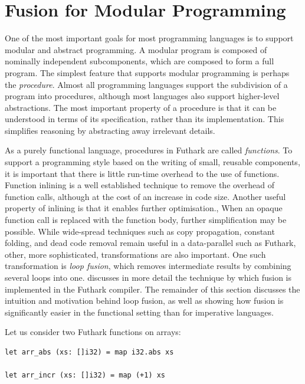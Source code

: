 \section{Fusion for Modular Programming}
\label{sec:fusion-for-modular-programming}

One of the most important goals for most programming languages is to
support modular and abstract programming.  A modular program is
composed of nominally independent subcomponents, which are composed to
form a full program.  The simplest feature that supports modular
programming is perhaps the \textit{procedure}.  Almost all programming
languages support the subdivision of a program into procedures,
although most languages also support higher-level abstractions.  The
most important property of a procedure is that it can be understood in
terms of its specification, rather than its implementation.  This
simplifies reasoning by abstracting away irrelevant details.

As a purely functional language, procedures in Futhark are called
\textit{functions}.  To support a programming style based on the
writing of small, reusable components, it is important that there is
little run-time overhead to the use of functions.  Function inlining
is a well established technique to remove the overhead of function
calls, although at the cost of an increase in code size.  Another
useful property of inlining is that it enables further optimisation.,
When an opaque function call is replaced with the function body,
further simplification may be possible.  While wide-spread techniques
such as copy propagation, constant folding, and dead code removal
remain useful in a data-parallel such as Futhark, other, more
sophisticated, transformations are also important.  One such
transformation is \textit{loop fusion}, which removes intermediate
results by combining several loops into one.  
discusses in more detail the technique by which fusion is implemented
in the Futhark compiler. The remainder of this section discusses the
intuition and motivation behind loop fusion, as well as showing how
fusion is significantly easier in the functional setting than for
imperative languages.

Let us consider two Futhark functions on arrays:

\begin{lstlisting}
let arr_abs (xs: []i32) = map i32.abs xs

let arr_incr (xs: []i32) = map (+1) xs
\end{lstlisting}

